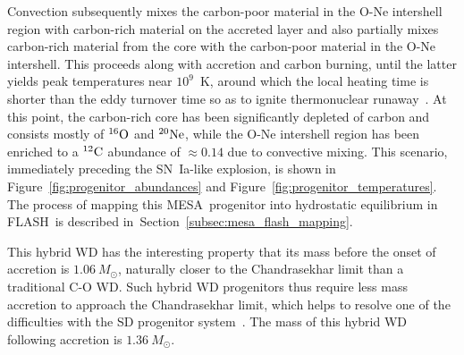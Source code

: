 \documentclass[iop,apj]{emulateapj}
\newcommand{\figref}[1]{Figure~\ref{#1}}
\newcommand{\secref}[1]{Section~\ref{#1}}
\newcommand{\SNIa}{SN~Ia}
\newcommand{\C}[1]{\ensuremath{{}^{#1}{\rm C}}}
\newcommand{\Ox}[1]{\ensuremath{{}^{#1}{\rm O}}}
\newcommand{\Ne}[1]{\ensuremath{{}^{#1}{\rm Ne}}}
\newcommand{\code}[1]{\textsc{#1}}
\newcommand{\FLASH}{\code{FLASH}}
\newcommand{\MESA}{\code{MESA}}
\newcommand{\unitstyle}[1]{\ensuremath{\mathrm{#1}}}
\newcommand{\Kelvin}{\unitstyle{K}}
\newcommand{\K}{\Kelvin}  %
\newcommand{\Msun}{\ensuremath{M_\odot}}
\begin{document}
Convection subsequently mixes the carbon-poor material in the
O-Ne intershell region with carbon-rich material on the accreted layer
and also partially mixes carbon-rich material from the core with the
carbon-poor material in the O-Ne intershell. This proceeds along with
accretion and carbon burning, until the latter yields peak
temperatures near $10^9$~\K, around which the local heating time is
shorter than the eddy turnover time so as to ignite thermonuclear
runaway~\citep{wunschwoosley2004}. At this point, the carbon-rich core
has been significantly depleted of carbon and consists mostly of
\Ox{16} and \Ne{20}, while the O-Ne intershell region has been
enriched to a \C{12} abundance of $\approx 0.14$ due to convective
mixing. This scenario, immediately preceding the \SNIa-like explosion,
is shown in \figref{fig:progenitor_abundances} and
\figref{fig:progenitor_temperatures}.  The process of mapping this
\MESA\ progenitor into hydrostatic equilibrium in \FLASH\ is described
in~\secref{subsec:mesa_flash_mapping}.  

This hybrid WD has the interesting property that its mass before the
onset of accretion is $1.06~\Msun$, naturally closer to the
Chandrasekhar limit than a traditional C-O WD. Such
hybrid WD progenitors thus require less mass accretion to approach
the Chandrasekhar limit, which helps to resolve one of the
difficulties with the SD progenitor
system~\citep{denissenkovetal2015,chenetal2014,kromeretal2015}. The
mass of this hybrid WD following accretion is $1.36~\Msun$.
\end{document}
